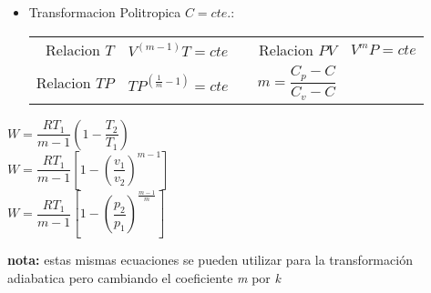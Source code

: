 \documentclass[a4paper, 11pt,titlepage]{book}
\begin{document}
\begin{tcolorbox}[title = \large\textbf{Transformaciones de gases}]
\begin{itemize}
\item Transformacion Politropica $C = cte.$:   
	 \begin{center}
		\begin{tabular}{r | l c r | l}
			\vspace{.3cm} Relacion $T$& $V^{(m-1)}T=cte$ && Relacion $PV$ &$V^mP = cte$\\
			\vspace{.3cm} Relacion $TP$ & $ TP^{(\frac{1}{m}-1)}=cte $ && $m = \dfrac{C_p - C}{C_v - C}$& 
		\end{tabular}
	\end{center}

\end{itemize}


		\begin{center}
			\vspace{.3cm} $W=\dfrac{R T_{1}}{m-1}\left(1-\dfrac{T_2}{T_1}\right)$\\
			\vspace{.3cm} $W=\dfrac{R T_{1}}{m-1}\left[1-\left(\dfrac{v_1}{v_2}\right)^{m-1}\right]$\\
			\vspace{.3cm} $W=\dfrac{R T_{1}}{m-1}\left[1-\left(\dfrac{p_2}{p_1}\right)^{\frac{m-1}{m}}\right]$
	\end{center}

\small{\textbf{nota:} estas mismas ecuaciones se pueden utilizar para la transformación adiabatica pero cambiando el coeficiente \emph{m} por \emph{k}}
\normalsize
\end{tcolorbox}



\end{document}
